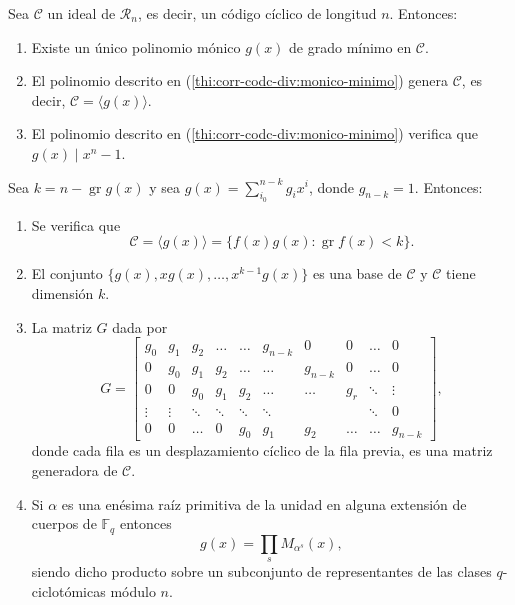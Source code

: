 \begin{theorem}
  \label{th:corr-cod-div}
  Sea \(\mathcal C\) un ideal de \(\mathcal R_n\), es decir, un código cíclico de longitud \(n\). Entonces:
  \begin{enumerate}
    \item Existe un único polinomio mónico \(g(x)\) de grado mínimo en \(\mathcal C\).\label{thi:corr-codc-div:monico-minimo}
    \item El polinomio descrito en (\ref{thi:corr-codc-div:monico-minimo}) genera \(\mathcal C\), es decir, \(\mathcal C = \langle g(x)\rangle\).
    \item El polinomio descrito en (\ref{thi:corr-codc-div:monico-minimo}) verifica que \(g(x) \mid x^n -1\).\label{thi:corr-codc-div:div-xn-1}
  \end{enumerate}
  Sea \(k = n - \operatorname{gr} g(x)\) y sea \(g(x) = \sum_{i_0}^{n-k}g_ix^{i}\), donde \(g_{n-k} = 1\). Entonces:
  \begin{enumerate}[resume]
    \item \label{thi:corr-codc-div:forma-elem} Se verifica que \[
      \mathcal C = \langle g(x) \rangle = \{f(x)g(x) : \operatorname{gr} f(x) < k\}.
    \]
    \item \label{thi:corr-codc-div:dim-ideal} El conjunto \(\{g(x), xg(x), \dots, x^{k-1}g(x)\}\) es una base de \(\mathcal C\) y \(\mathcal C\) tiene dimensión \(k\).
    \item \label{thi:corr-cod-div:mat-gen} La matriz \(G\) dada por \[
      G = \begin{bmatrix}
        g_0 & g_1 & g_2 & \dots & \dots & g_{n-k} & 0 & 0 & \dots & 0 \\
        0 & g_0 & g_1 & g_2 & \dots & \dots & g_{n-k} & 0 & \dots & 0 \\
        0 & 0 & g_0 & g_1 & g_2 & \dots & \dots & g_r & \ddots & \vdots \\
        \vdots & \vdots & \ddots & \ddots & \ddots & \ddots & & & \ddots & 0\\
        0 & 0 & \dots & 0 & g_0 & g_1 & g_2 & \dots & \dots & g_{n-k} 
      \end{bmatrix},
    \]
    donde cada fila es un desplazamiento cíclico de la fila previa, es una matriz generadora de \(\mathcal C\).
    \item \label{thi:pol-generador-prod-minimal} Si \(\alpha\) es una enésima raíz primitiva de la unidad en alguna extensión de cuerpos de \(\mathbb F_q\) entonces \[
      g(x) = \prod_s M_{\alpha^s}(x),
    \] siendo dicho producto sobre un subconjunto de representantes de las clases \(q\)-ciclotómicas módulo \(n\).
  \end{enumerate}
\end{theorem}

